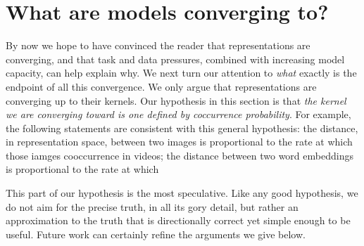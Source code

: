 \section{What are models converging to?}

By now we hope to have convinced the reader that representations are converging, and that task and data pressures, combined with increasing model capacity, can help explain why. We next turn our attention to \textit{what} exactly is the endpoint of all this convergence. We only argue that representations are converging up to their kernels. Our hypothesis in this section is that \textit{the kernel we are converging toward is one defined by coccurrence probability}. For example, the following statements are consistent with this general hypothesis: the distance, in representation space, between two images is proportional to the rate at which those iamges cooccurrence in videos; the distance between two word embeddings is proportional to the rate at which 

This part of our hypothesis is the most speculative. Like any good hypothesis, we do not aim for the precise truth, in all its gory detail, but rather an approximation to the truth that is directionally correct yet simple enough to be useful. Future work can certainly refine the arguments we give below.



